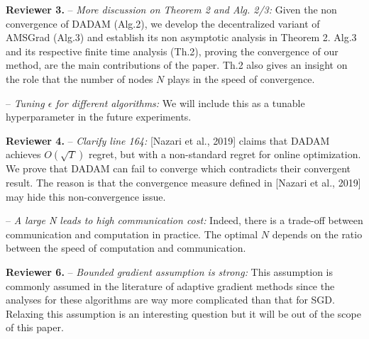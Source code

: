 \documentclass{article}
\begin{document}
\vspace{-2pt}

\textbf{Reviewer 3.} 
-- \textit{More discussion on Theorem 2 and Alg. 2/3:}
Given the non convergence of DADAM (Alg.2), we develop the decentralized variant of AMSGrad (Alg.3) and establish its non asymptotic analysis in Theorem 2.
Alg.3 and its respective finite time analysis (Th.2), proving the convergence of our method, are the main contributions of the paper. 
Th.2 also gives an insight on the role that the number of nodes $N$ plays in the speed of convergence.

\vspace{-5pt}

-- \textit{Tuning $\epsilon$ for different algorithms:}
We will include this as a tunable hyperparameter in the future experiments. 

\vspace{-2pt}


\textbf{Reviewer 4.} 
-- \textit{ Clarify line 164:}
 [Nazari et al., 2019] claims that DADAM achieves $O(\sqrt{T})$ regret, but with a non-standard regret for online optimization. 
 We prove that DADAM can fail to converge which contradicts their convergent result. 
 The reason is that the convergence measure defined in [Nazari et al., 2019] may hide this non-convergence issue.\vspace{-5pt}

-- \textit{A large N leads to high communication cost:}
Indeed, there is a trade-off between communication and computation in practice.
The optimal $N$ depends on the ratio between the speed of computation and communication.  

\vspace{-2pt}

\textbf{Reviewer 6.} 
-- \textit{Bounded gradient assumption is strong:}
This assumption is commonly assumed in the literature of adaptive gradient methods since the analyses for these algorithms are way more complicated than that for SGD. 
Relaxing this assumption is an interesting question but it will be out of the scope of this paper.\vspace{-5pt}
\end{document}
